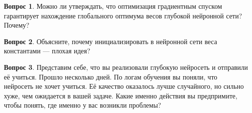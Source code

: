 \documentclass[12pt]{article}
\theoremstyle{definition}
\newtheorem{question}{Вопрос}
\begin{document}
\vspace{8cm} 

\begin{question}
   Можно ли утверждать, что оптимизация градиентным спуском гарантирует нахождение глобального оптимума весов глубокой нейронной сети?  Почему?
\end{question}

\newpage 

\begin{question}
    Объясните, почему инициализировать в нейронной сети веса константами --- плохая идея?
\end{question}


\vspace{8cm} 


\begin{question}
    Представим себе, что вы реализовали глубокую нейросеть и отправили её учиться. Прошло несколько дней. По логам обучения вы поняли, что нейросеть не хочет учиться. Её качество оказалось лучше случайного, но сильно хуже, чем ожидается в вашей задаче. Какие именно действия вы предпримите, чтобы понять, где именно у вас возникли проблемы?
\end{question}



\newpage 
\end{document}
